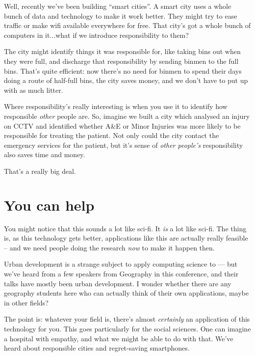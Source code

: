 \documentclass[draft]{tufte-handout}
\begin{document}

Well, recently we've been building ``smart cities''. A smart city uses a whole bunch of data and technology to make it work better. They might try to ease traffic or make wifi available everywhere for free. That city's got a whole bunch of computers in it...what if we introduce responsibility to them?\par

The city might identify things it was responsible for, like taking bins out when they were full, and discharge that responsibility by sending binmen to the full bins. That's quite efficient: now there's no need for binmen to spend their days doing a route of half-full bins, the city saves money, and we don't have to put up with as much litter.\par

Where responsibility's really interesting is when you use it to identify how responsible \emph{other} people are. So, imagine we built a city which analysed an injury on CCTV and identified whether A&E or Minor Injuries was more likely to be responsible for treating the patient. Not only could the city contact the emergency services for the patient, but it's sense of \emph{other people's} responsibility also saves time and money.\par

That's a really big deal.\par

\section{You can help}
You might notice that this sounds a lot like sci-fi. It \emph{is} a lot like sci-fi. The thing is, as this technology gets better, applications like this are actually really feasible -- and we need people doing the research \emph{now} to make it happen then.\par
Urban development is a strange subject to apply computing science to --- but we've heard from a few speakers from Geography in this conference, and their talks have mostly been urban development. I wonder whether there are any geography students here who can actually think of their own applications, maybe in other fields?\par

The point is: whatever your field is, there's almost \emph{certainly} an application of this technology for you. This goes particularly for the social sciences. One can imagine a hospital with empathy, and what we might be able to do with that. We've heard about responsible cities and regret-saving smartphones.\par
\end{document}
